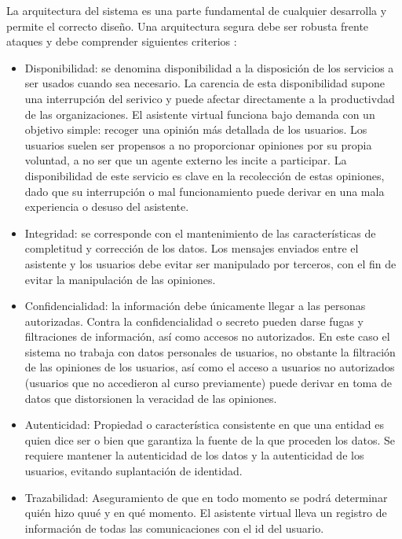 La arquitectura del sistema es una parte fundamental de cualquier desarrolla y permite el correcto diseño. Una arquitectura segura debe ser robusta frente ataques y debe comprender siguientes criterios \cite{ule}: 

\begin{itemize}
    \item Disponibilidad: se denomina disponibilidad a la disposición de los servicios a ser usados cuando sea necesario. La carencia de esta disponibilidad supone una interrupción del serivico y puede afectar directamente a la productivdad de las organizaciones. El asistente virtual funciona bajo demanda con un objetivo simple: recoger una opinión más detallada de los usuarios. Los usuarios suelen ser propensos a no proporcionar opiniones por su propia voluntad, a no ser que un agente externo les incite a participar. La disponibilidad de este servicio es clave en la recolección de estas opiniones, dado que su interrupción o mal funcionamiento puede derivar en una mala experiencia o desuso del asistente.
    \item Integridad: se corresponde con el mantenimiento de las características de completitud y corrección de los datos. Los mensajes enviados entre el asistente y los usuarios debe evitar ser manipulado por terceros, con el fin de evitar la manipulación de las opiniones.
    \item Confidencialidad: la información debe únicamente llegar a las personas autorizadas. Contra la confidencialidad o secreto pueden darse fugas y filtraciones de información, así como accesos no autorizados. En este caso el sistema no trabaja con datos personales de usuarios, no obstante la filtración de las opiniones de los usuarios, así como el acceso a usuarios no autorizados (usuarios que no accedieron al curso previamente) puede derivar en toma de datos que distorsionen la veracidad de las opiniones.
    \item Autenticidad: Propiedad o característica consistente en que una entidad es quien dice ser o bien que garantiza la fuente de la que proceden los datos. Se requiere mantener la autenticidad de los datos y la autenticidad de los usuarios, evitando suplantación de identidad.
    \item Trazabilidad: Aseguramiento de que en todo momento se podrá determinar quién hizo quué y en qué momento. El asistente virtual lleva un registro de información de todas las comunicaciones con el id del usuario.
\end{itemize}
 

